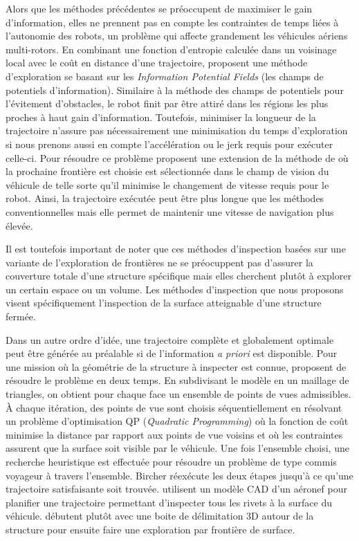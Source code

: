 Alors que les méthodes précédentes se préoccupent de maximiser le gain d'information, elles ne prennent pas en compte les contraintes de temps liées à l'autonomie des robots, un problème qui affecte grandement les véhicules aériens multi-rotors. En combinant une fonction d'entropie calculée dans un voisinage local avec le coût en distance d'une trajectoire, \citep{Wang2017} proposent une méthode d'exploration se basant sur les \textit{Information Potential Fields} (les champs de potentiels d'information). Similaire à la méthode des champs de potentiels pour l'évitement d'obstacles, le robot finit par être attiré dans les régions les plus proches à haut gain d'information. Toutefois, minimiser la longueur de la trajectoire n'assure pas nécessairement une minimisation du temps d'exploration si nous prenons aussi en compte l'accélération ou le jerk requis pour exécuter celle-ci. Pour résoudre ce problème \citep{Cieslewski2017} proposent une extension de la méthode de \citep{Yamauchi1997} où la prochaine frontière est choisie est sélectionnée dans le champ de vision du véhicule de telle sorte qu'il minimise le changement de vitesse requis pour le robot. Ainsi, la trajectoire exécutée peut être plus longue que les méthodes conventionnelles mais elle permet de maintenir une vitesse de navigation plus élevée.

Il est toutefois important de noter que ces méthodes d'inspection basées sur une variante de l'exploration de frontières ne se préocuppent pas d'assurer la couverture totale d'une structure spécifique mais elles cherchent plutôt à explorer un certain espace ou un volume. Les méthodes d'inspection que nous proposons visent spécifiquement l'inspection de la surface atteignable d'une structure fermée.

Dans un autre ordre d'idée, une trajectoire complète et globalement optimale peut être générée au préalable si de l'information \textit{a priori} est disponible. Pour une mission où la géométrie de la structure à inspecter est connue, \citep{Bircher2015} proposent de résoudre le problème en deux temps. En subdivisant le modèle en un maillage de triangles, on obtient pour chaque face un ensemble de points de vues admissibles. À chaque itération, des points de vue sont choisis séquentiellement en résolvant un problème d'optimisation QP (\emph{Quadratic Programming}) où la fonction de coût minimise la distance par rapport aux points de vue voisins et où les contraintes assurent que la surface soit visible par le véhicule. Une fois l'ensemble choisi, une recherche heuristique est effectuée pour résoudre un problème de type commis voyageur à travers l'ensemble. Bircher réexécute les deux étapes jusqu'à ce qu'une trajectoire satisfaisante soit trouvée. \citep{sheng2008crawler} utilisent un modèle CAD d'un aéronef pour planifier une trajectoire permettant d'inspecter tous les rivets à la surface du véhicule. \citep{Yoder2016} débutent plutôt avec une boite de délimitation 3D autour de la structure pour ensuite faire une exploration par frontière de surface.

